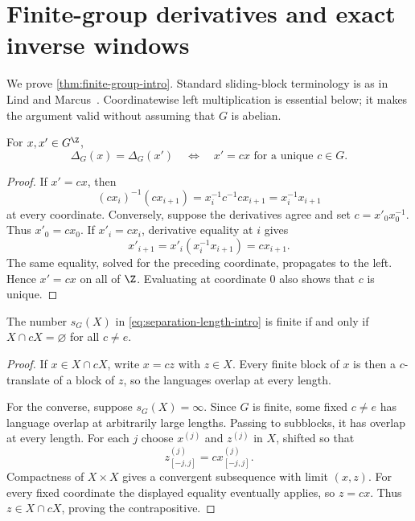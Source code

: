 \section{Finite-group derivatives and exact inverse windows}

We prove \cref{thm:finite-group-intro}.  Standard sliding-block terminology is
as in Lind and Marcus~\cite{LindMarcus1995}.  Coordinatewise left
multiplication is essential below; it makes the argument valid without
assuming that $G$ is abelian.

\begin{lemma}\label{lem:fibres}
For $x,x'\in G^\Z$,
\[
 \Delta_G(x)=\Delta_G(x')
 \quad\Longleftrightarrow\quad
 x'=cx\text{ for a unique }c\in G.
\]
\end{lemma}

\begin{proof}
If $x'=cx$, then
\[
 (cx_i)^{-1}(cx_{i+1})=x_i^{-1}c^{-1}cx_{i+1}
 =x_i^{-1}x_{i+1}
\]
at every coordinate.  Conversely, suppose the derivatives agree and set
$c=x'_0x_0^{-1}$.  Thus $x'_0=cx_0$.  If $x'_i=cx_i$, derivative equality at
$i$ gives
\[
 x'_{i+1}=x'_i(x_i^{-1}x_{i+1})=cx_{i+1}.
\]
The same equality, solved for the preceding coordinate, propagates to the
left.  Hence $x'=cx$ on all of $\Z$.  Evaluating at coordinate $0$ also shows
that $c$ is unique.
\end{proof}

\begin{lemma}\label{lem:compact-separation}
The number $s_G(X)$ in \eqref{eq:separation-length-intro} is finite if and only
if $X\cap cX=\varnothing$ for all $c\neq e$.
\end{lemma}

\begin{proof}
If $x\in X\cap cX$, write $x=cz$ with $z\in X$.  Every finite block of $x$ is
then a $c$-translate of a block of $z$, so the languages overlap at every
length.

For the converse, suppose $s_G(X)=\infty$.  Since $G$ is finite, some fixed
$c\neq e$ has language overlap at arbitrarily large lengths.  Passing to
subblocks, it has overlap at every length.  For each $j$ choose $x^{(j)}$ and
$z^{(j)}$ in $X$, shifted so that
\[
 z^{(j)}_{[-j,j]}=c x^{(j)}_{[-j,j]}.
\]
Compactness of $X\times X$ gives a convergent subsequence with limit $(x,z)$.
For every fixed coordinate the displayed equality eventually applies, so
$z=cx$.  Thus $z\in X\cap cX$, proving the contrapositive.
\end{proof}

